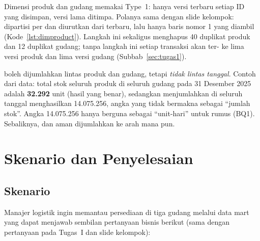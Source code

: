  Dimensi produk dan gudang memakai  Type~1: hanya versi terbaru setiap ID yang disimpan, versi lama ditimpa. Polanya sama dengan slide kelompok:  dipartisi per  dan diurutkan dari  terbaru, lalu hanya baris nomor 1 yang diambil (Kode~\ref{lst:dimproduct}). Langkah ini sekaligus menghapus 40 duplikat produk dan 12 duplikat gudang; tanpa langkah ini setiap transaksi akan ter- ke lima versi produk dan lima versi gudang (Subbab~\ref{sec:tugas1}).



  boleh dijumlahkan lintas produk dan gudang, tetapi \emph{tidak lintas tanggal}. Contoh dari data: total stok seluruh produk di seluruh gudang pada 31 Desember 2025 adalah \textbf{32.292} unit (hasil yang benar), sedangkan menjumlahkan  di seluruh tanggal menghasilkan 14.075.256, angka yang tidak bermakna sebagai ``jumlah stok''. Angka 14.075.256 hanya berguna sebagai ``unit-hari'' untuk rumus  (BQ1). Sebaliknya,  dan  aman dijumlahkan ke arah mana pun.

\section{Skenario dan Penyelesaian}\label{sec:skenario}

\subsection{Skenario}
Manajer logistik ingin memantau persediaan di tiga gudang melalui data mart yang dapat menjawab sembilan pertanyaan bisnis berikut (sama dengan pertanyaan pada Tugas~I dan slide kelompok):


